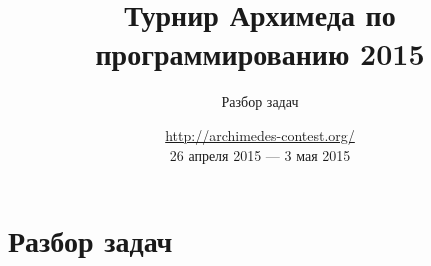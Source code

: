 \documentclass[10pt,pdf,hyperref={unicode}]{beamer}
\title[Турнир Архимеда по программированию 2015] %
{Турнир Архимеда по программированию 2015}
\subtitle{Разбор задач}
\author[Мингалёв, Игнатьева] %
{{Олег~Мингалёв\inst{1} \and Елизавета~Игнатьева\inst{2}} \\ {Александр~Тимин\inst{3} \and Валерия~Петрова\inst{4}}}
\institute[Universities Here and There] %
{
  \inst{1}%
  ГБОУ <<Физматшкола 2007>>, г. Москва
  \and
  \inst{2}%
  Московский Физико-Технический Институт, г. Долгопрудный
  \and
  \inst{3}%
  ООО <<Яндекс>>, г. Москва
  \and
  \inst{4}
  Центр онлайн-обучения <<Фоксфорд>>, г. Санкт-Петербург
}
\date[KPT 2015] %
{\url{http://archimedes-contest.org/}\\
26 апреля 2015 --- 3 мая 2015}
\begin{document}
  \frame{\titlepage}
  \section{Разбор задач}
  
  
  
  
  
  
  
  
\end{document}
